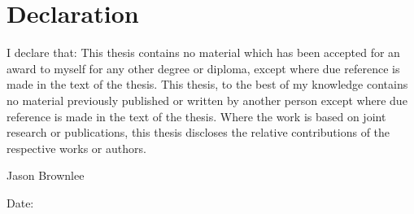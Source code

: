 %
%

\chapter*{Declaration}
\label{declaration}
\thispagestyle{empty}
I declare that: This thesis contains no material which has been accepted for an award to myself for any other degree or diploma, except where due reference is made in the text of the thesis. This thesis, to the best of my knowledge contains no material previously published or written by another person except where due reference is made in the text of the thesis. Where the work is based on joint research or publications, this thesis discloses the relative contributions of the respective works or authors.

\begin{flushleft}
\vspace{1in}
Jason Brownlee

\vspace{0.5cm}
Date:
\end{flushleft}

